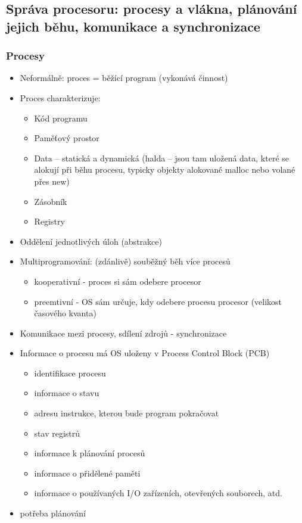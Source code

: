 \documentclass[10pt,a4paper]{article}
\begin{document}
\subsection{Správa procesoru: procesy a vlákna, plánování jejich běhu, komunikace a synchronizace}

\subsubsection{Procesy}
\begin{itemize}
	\item Neformálně: proces = běžící program (vykonává činnost)
	\item Proces charakterizuje:
	\begin{itemize}
		\item Kód programu
		\item Paměťový prostor
		\item Data – statická a dynamická (halda – jsou tam uložená data, které se alokují při běhu procesu, typicky objekty alokované malloc nebo volané přes new)
		\item Zásobník
		\item Registry
	\end{itemize}
	\item Oddělení jednotlivých úloh (abstrakce)
	\item Multiprogramování: (zdánlivě) souběžný běh více procesů
	\begin{itemize}
		\item kooperativní - proces si sám odebere procesor
		\item preemtivní - OS sám určuje, kdy odebere procesu procesor (velikost časového kvanta)
	\end{itemize}
	\item Komunikace mezi procesy, sdílení zdrojů - synchronizace
	\item Informace o procesu má OS uloženy v Process  Control Block (PCB)
	\begin{itemize}
		\item identifikace procesu
		\item informace o stavu
		\item adresu instrukce, kterou bude program pokračovat
		\item stav registrů
		\item informace k plánování procesů
		\item informace o přidělené paměti
		\item informace o používaných I/O zařízeních, otevřených souborech, atd.
	\end{itemize}
	\item potřeba plánování
\end{itemize}
\end{document}
